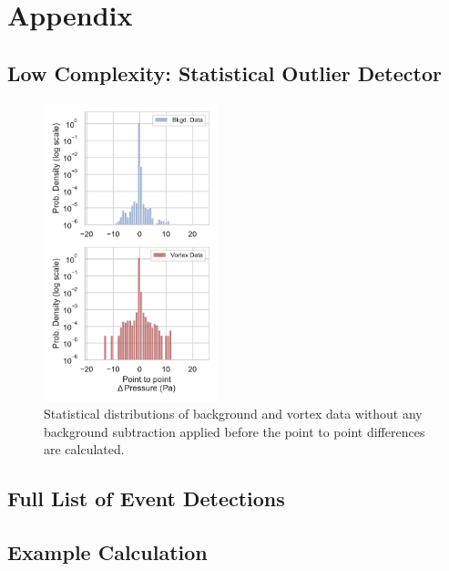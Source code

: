 \section{Appendix}
\subsection{Low Complexity: Statistical Outlier Detector}
\begin{figure}
    \centering
    \includegraphics[width=0.45\textwidth]{figures/manuscript_static_detector_without_ma500_subtraction_overview_fig_v1.pdf}
    \caption{Statistical distributions of background and vortex data without any background subtraction applied before the point to point differences are calculated.}
    \label{fig_appendix:vortex_press_diff_without_bkgd_subtraction_dist_fit}
\end{figure}

\subsection{Full List of Event Detections}

\subsection{Example Calculation}

